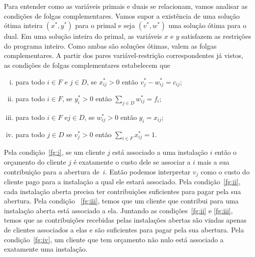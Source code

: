 Para entender como as variáveis primais e duais se relacionam, vamos analisar as condições de folgas complementares. Vamos supor a existência de uma solução ótima inteira $(x^*,y^*)$ para o primal e seja $(v^*,w^*)$ uma solução ótima para o dual. Em uma solução inteira do primal, as variáveis $x$ e $y$ satisfazem as restrições do programa inteiro. Como ambas são soluções ótimas, valem as folgas complementares. A partir dos pares variável-restrição correspondentes já vistos, as condições de folgas complementares estabelecem que
\begin{enumerate}[(i)]
    \item para todo $i \in F$ e $j \in D$, se $x^*_{ij} > 0$ então $v^*_j - w^*_{ij} = c_{ij}$\label{fg:i};
    \item para todo $ i \in F$, se $y^*_i > 0$ então $\sum_{j \in D} w^*_{ij} = f_i$\label{fg:ii};
    \item para todo $i \in F$ e$ j \in D$, se $w^*_{ij}>0$ então $ y_i = x_{ij}$\label{fg:iii};
    \item para todo $j \in D$ se $v^*_j > 0$  então $\sum_{i \in F}x^*_{ij} = 1$\label{fg:iv}.
\end{enumerate}
Pela condição~\eqref{fg:i}, se um cliente $j$ está associado a uma instalação $i$ então o orçamento do cliente $j$ é exatamente o custo dele se associar a $i$ mais a sua contribuição para a abertura de~$i$. Então podemos interpretar $v_j$ como o custo do cliente pago para a instalação a qual ele estará associado. 
Pela condição~\eqref{fg:ii}, cada instalação aberta precisa ter contribuições suficientes para pagar pela sua abertura. Pela condição ~\eqref{fg:iii}, temos que um cliente que contribui para uma instalação aberta está associado a ela. Juntando as condições~\eqref{fg:ii} e \eqref{fg:iii}, temos que as contribuições recebidas pelas instalações abertas são vindas apenas de clientes associados a elas e são suficientes para pagar pela sua abertura. 
Pela condição~\eqref{fg:iv}, um cliente que tem orçamento não nulo está associado a exatamente uma instalação.